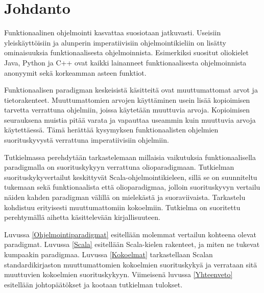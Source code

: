 \chapter{Johdanto} \label{Johdanto}
Funktionaalinen ohjelmointi kasvattaa suosiotaan jatkuvasti. Useisiin yleiskäyttöisiin ja alunperin imperatiivisiin ohjelmointikieliin on lisätty ominaisuuksia funktionaalisesta ohjelmoinnista. Esimerkiksi suositut oliokielet Java, Python ja C++ ovat kaikki lainanneet funktionaalisesta ohjelmoinnista anonyymit sekä korkeamman asteen funktiot.

Funktionaalisen paradigman keskeisistä käsitteitä ovat muuttumattomat arvot ja tietorakenteet. Muuttumattomien arvojen käyttäminen usein lisää kopioimisen tarvetta verrattuna ohjelmiin, joissa käytetään muuttuvia arvoja. Kopioimisen seurauksena muistia pitää varata ja vapauttaa useammin kuin muuttuvia arvoja käytettäessä. Tämä herättää kysymyksen funktionaalisten ohjelmien suorituskyvystä verrattuna imperatiivisiin ohjelmiin.

Tutkielmassa perehdytään tarkastelemaan millaisia vaikutuksia funktionaalisella paradigmalla on suorituskykyyn verrattuna olioparadigmaan. Tutkielman suorituskykyvertailut keskittyvät Scala-ohjelmointikieleen, sillä se on suunniteltu tukemaan sekä funktionaalista että olioparadigmaa, jolloin suorituskyvyn vertailu näiden kahden paradigman välillä on mielekästä ja suoraviivaista. Tarkastelu kohdistuu erityisesti muuttumattomiin kokoelmiin.  Tutkielma on suoritettu perehtymällä aihetta käsittelevään kirjallisuuteen.

Luvussa \ref{Ohjelmointiparadigmat} esitellään molemmat vertailun kohteena olevat paradigmat. Luvussa \ref{Scala} esitellään Scala-kielen rakenteet, ja miten ne tukevat kumpaakin paradigmaa. Luvussa \ref{Kokoelmat} tarkastellaan Scalan standardikirjaston muuttumattomien kokoelmien suorituskykyä ja verrataan sitä muuttuvien kokoelmien suorituskykyyn. Viimeisenä luvussa \ref{Yhteenveto} esitellään johtopäätökset ja kootaan tutkielman tulokset.

